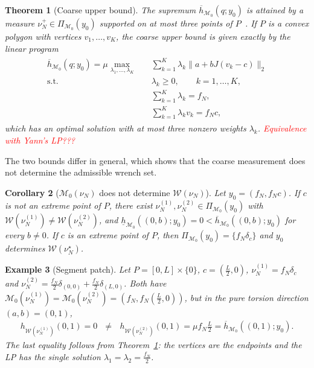 \documentclass[11pt,a4paper]{article}
\theoremstyle{plain}
\newtheorem{theorem}{Theorem}[section]
\newtheorem{corollary}[theorem]{Corollary}
\newtheorem{example}[theorem]{Example}
\begin{document}
\begin{theorem}[Coarse upper bound]
\label{cor:coarse_upper_polygon}
    The supremum $\overline h_{\mathcal M_0}(q;y_0)$ is attained by a measure $\nu_N^+\in\Pi_{\mathcal M_0}(y_0)$ supported on at most three points of $P$~\cite{winkler1988extreme}.
    If $P$ is a convex polygon with vertices $v_1,\ldots,v_K$, the coarse upper bound is given exactly by
    the linear program
    \begin{align}
    \boxed{
    \begin{aligned}
        \overline h_{\mathcal M_0}(q;y_0)
        =
        \mu\max_{\lambda_1,\ldots,\lambda_K}\quad&
        \sum_{k=1}^K
        \lambda_k\|a+bJ(v_k-c)\|_2\\
        \text{s.t.}\quad&
        \lambda_k\geq0,\qquad k=1,\ldots,K,\\
        &
        \sum_{k=1}^K\lambda_k=f_N,\\
        &
        \sum_{k=1}^K\lambda_kv_k=f_Nc,
    \end{aligned}}
    \end{align}
    which has an optimal solution with at most three nonzero weights $\lambda_k$.
    \textcolor{red}{Equivalence with Yann's LP???}
\end{theorem}

The two bounds differ in general, which shows that the coarse measurement does not determine the admissible wrench set.

\begin{corollary}[$\mathcal M_0(\nu_N)$ does not determine $\mathcal W(\nu_N)$]
\label{cor:M0_not_identifying}
    Let $y_0=(f_N,f_Nc)$. If $c$ is not an extreme point of $P$, there exist $\nu_N^{(1)},\nu_N^{(2)}\in\Pi_{\mathcal M_0}(y_0)$
    with $\mathcal W(\nu_N^{(1)})\neq\mathcal W(\nu_N^{(2)})$, and
    $\underline h_{\mathcal M_0}((0,b);y_0)=0<\overline h_{\mathcal M_0}((0,b);y_0)$ for every $b\neq0$.
    If $c$ is an extreme point of $P$, then $\Pi_{\mathcal M_0}(y_0)=\{f_N\delta_c\}$ and $y_0$ determines $\mathcal W(\nu_N^\star)$.
\end{corollary}

\begin{example}[Segment patch]
\label{ex:segment}
    Let $P=[0,L]\times\{0\}$, $c=\left(\frac{L}{2},0\right)$, $\nu_N^{(1)}=f_N\delta_c$ and
    $\nu_N^{(2)}=\frac{f_N}{2}\delta_{(0,0)}+\frac{f_N}{2}\delta_{(L,0)}$. Both have
    $\mathcal M_0(\nu_N^{(1)})=\mathcal M_0(\nu_N^{(2)})=\left(f_N,f_N\left(\frac{L}{2},0\right)\right)$, but in the pure torsion direction
    $(a,b)=(0,1)$,
    \begin{align}
    h_{\mathcal W(\nu_N^{(1)})}(0,1)=0 ~~~\neq~~~ h_{\mathcal W(\nu_N^{(2)})}(0,1)=\mu f_N\frac{L}{2}=\overline h_{\mathcal M_0}((0,1);y_0).
    \end{align}
    The last equality follows from Theorem~\ref{cor:coarse_upper_polygon}: the vertices are the endpoints and the LP has the single solution $\lambda_1=\lambda_2=\frac{f_N}{2}$.
\end{example}
\end{document}
